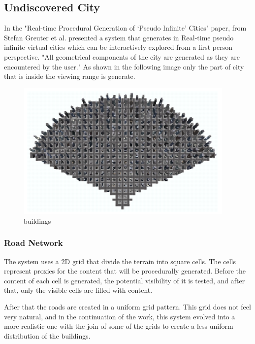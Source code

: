\subsection{Undiscovered City} %
\label{sub:undiscovered_city}

In the "Real-time Procedural Generation of ‘Pseudo Infinite’ Cities" paper, from Stefan Greuter et al. presented a system that generates in Real-time pseudo infinite virtual cities which can be interactively explored from a first person perspective. "All geometrical components of the city are generated as they are encountered by the user." As shown in the following image only the part of city that is inside the viewing range is generate.

\begin{figure}[htbp]
	\centering
	\includegraphics[width=0.95\textwidth]{img/Real-Time-procedural-generation/viewing-range.png}
	\caption{buildings}
	\label{fig:label}
\end{figure}

\subsubsection{Road Network} %
\label{ssub:road_network}

The system uses a 2D grid that divide the terrain into square cells. The cells represent proxies for the content that will be procedurally generated. Before the content of each cell is generated, the potential visibility of it is tested, and after that, only the visible cells are filled with content.

After that the roads are created in a uniform grid pattern. This grid does not feel very natural, and in the continuation of the work, this system evolved into a more realistic one with the join of some of the grids to create a less uniform distribution of the buildings.


